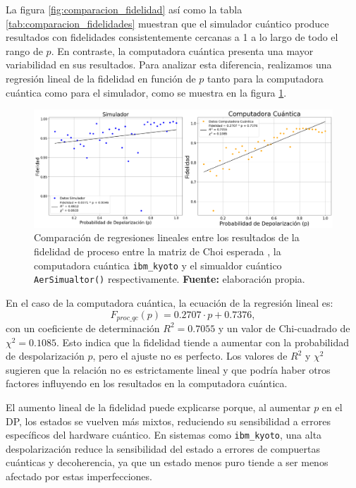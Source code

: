 \documentclass[letterpaper,12pt]{thesisECFM}
\theoremstyle{plain}
\theoremstyle{definition}
\theoremstyle{definition}
\theoremstyle{remark}
\newcommand{\1}{\mathbb{1}}
\begin{document}
La figura \ref{fig:comparacion_fidelidad} así como la tabla
\ref{tab:comparacion_fidelidades} muestran que el simulador cuántico produce
resultados con fidelidades consistentemente cercanas a 1 a lo largo de todo el
rango de $p$. En contraste, la computadora cuántica presenta una mayor
variabilidad en sus resultados. Para analizar esta diferencia, realizamos una
regresión lineal de la fidelidad en función de $p$ tanto para la computadora
cuántica como para el simulador, como se muestra en la figura
\ref{fig:comparacion_regresiones}.

\begin{figure}[h!]
    \centering
    \includegraphics[width=0.95\linewidth]{imagenes/Comparacion_regresiones.png}
    \caption{Comparación de regresiones lineales entre los resultados de la fidelidad de proceso entre la matriz de Choi esperada , la computadora cuántica \texttt{ibm\_kyoto} y el simualdor cuántico \texttt{AerSimualtor()} respectivamente. \textbf{Fuente:} elaboración propia.}
    \label{fig:comparacion_regresiones}
\end{figure}

En el caso de la computadora cuántica, la ecuación de la regresión lineal es:
\begin{equation}
    F_{proc\_qc}(p) = 0.2707 \cdot p + 0.7376,
\end{equation}
con un coeficiente de determinación $R^2 = 0.7055$ y un valor de Chi-cuadrado
de $\chi^2 = 0.1085$.  Esto indica que la fidelidad tiende a aumentar con la
probabilidad de despolarización $p$, pero el ajuste no es perfecto. Los valores
de $R^2$ y $\chi^2$ sugieren que la relación no es estrictamente lineal y que
podría haber otros factores influyendo en los resultados en la computadora
cuántica.

El aumento lineal de la fidelidad puede explicarse porque,
al aumentar $p$ en el DP, los estados se vuelven más
mixtos, reduciendo su sensibilidad a errores específicos del hardware cuántico.
En sistemas como \texttt{ibm\_kyoto}, una alta despolarización reduce la
sensibilidad del estado a errores de compuertas cuánticas y decoherencia, ya
que un estado menos puro tiende a ser menos afectado por estas imperfecciones.
\end{document}
